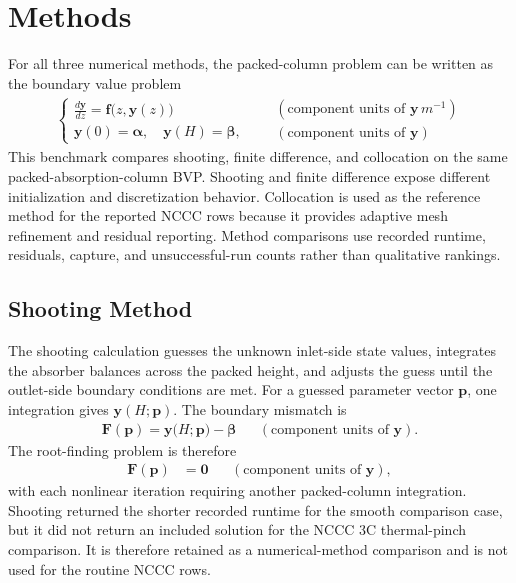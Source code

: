     \section{Methods}
        For all three numerical methods, the packed-column problem can be written as the boundary value problem
        \begin{align}
            \begin{cases}
            \displaystyle
            \frac{d \mathbf{y}}{dz} = \mathbf{f}\bigl(z, \mathbf{y}(z)\bigr) \\
            \mathbf{y}(0) = \boldsymbol{\alpha}, \quad \mathbf{y}(H) = \boldsymbol{\beta},
            \end{cases}
            &&
            \begin{matrix}
            \left(\text{component units of }\mathbf{y}\,\unit{m^{-1}}\right)\\
            \left(\text{component units of }\mathbf{y}\right)
            \end{matrix}
        \end{align}
        This benchmark compares shooting, finite difference, and collocation on the same packed-absorption-column BVP. Shooting and finite difference expose different initialization and discretization behavior. Collocation is used as the reference method for the reported NCCC rows because it provides adaptive mesh refinement and residual reporting. Method comparisons use recorded runtime, residuals, capture, and unsuccessful-run counts rather than qualitative rankings.

        \subsection{Shooting Method}
            The shooting calculation guesses the unknown inlet-side state values, integrates the absorber balances across the packed height, and adjusts the guess until the outlet-side boundary conditions are met. For a guessed parameter vector $\mathbf{p}$, one integration gives $\mathbf{y}(H;\mathbf{p})$. The boundary mismatch is
                \begin{align}
                    \mathbf{F}(\mathbf{p}) = \mathbf{y}\bigl(H; \mathbf{p}\bigr) - \boldsymbol{\beta}
                    && \left(\text{component units of }\mathbf{y}\right).
                \end{align}
                The root-finding problem is therefore
                \begin{align}
                    \mathbf{F}(\mathbf{p}) &= \mathbf{0}
                    && \left(\text{component units of }\mathbf{y}\right),
                \end{align}
                with each nonlinear iteration requiring another packed-column integration. Shooting returned the shorter recorded runtime for the smooth comparison case, but it did not return an included solution for the NCCC 3C thermal-pinch comparison. It is therefore retained as a numerical-method comparison and is not used for the routine NCCC rows.

